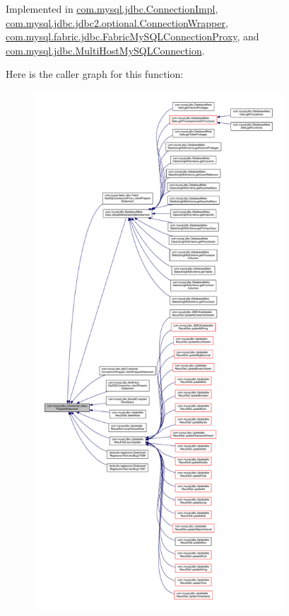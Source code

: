 Implemented in \mbox{\hyperlink{classcom_1_1mysql_1_1jdbc_1_1_connection_impl_a10c73f6da363742abd84a76ea024292d}{com.\+mysql.\+jdbc.\+Connection\+Impl}}, \mbox{\hyperlink{classcom_1_1mysql_1_1jdbc_1_1jdbc2_1_1optional_1_1_connection_wrapper_a8c765f36b8ba9d9a0011768a878f3275}{com.\+mysql.\+jdbc.\+jdbc2.\+optional.\+Connection\+Wrapper}}, \mbox{\hyperlink{classcom_1_1mysql_1_1fabric_1_1jdbc_1_1_fabric_my_s_q_l_connection_proxy_a518405c081dacd0e856bead503a333e2}{com.\+mysql.\+fabric.\+jdbc.\+Fabric\+My\+S\+Q\+L\+Connection\+Proxy}}, and \mbox{\hyperlink{classcom_1_1mysql_1_1jdbc_1_1_multi_host_my_s_q_l_connection_af9777071bc7848bd47f094d8ff57d54d}{com.\+mysql.\+jdbc.\+Multi\+Host\+My\+S\+Q\+L\+Connection}}.

Here is the caller graph for this function\+:\nopagebreak
\begin{figure}[H]
\begin{center}
\leavevmode
\includegraphics[height=550pt]{interfacecom_1_1mysql_1_1jdbc_1_1_connection_a1836d2e9bc2f4f47fb77b2418d08616a_icgraph}
\end{center}
\end{figure}
\mbox{\label{interfacecom_1_1mysql_1_1jdbc_1_1_connection_a4942503d586cb18634b960ee276fa1bb}} 
